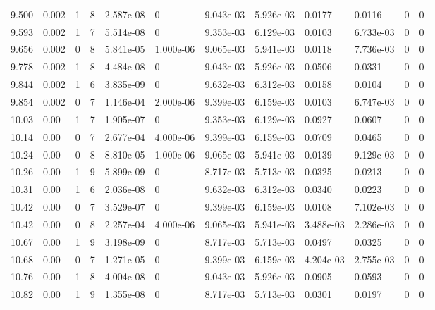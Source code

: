 \documentclass[preview]{standalone}
\begin{document}
{{{{\begin{tabular}{L{1.2cm}C{1.2cm} C{0.3cm}C{0.5cm} C{1.4cm}C{1.4cm} C{1.4cm}C{1.4cm} C{1.6cm}C{1.6cm} C{1.6cm}C{1.6cm}}
  9.500  &  0.002  & 1     &  8 &  2.587e-08  & 0  &  9.043e-03&   5.926e-03& 0.0177 & 0.0116   &  0 & 0  \\ 
  9.593  &  0.002  & 1     &  7 &  5.514e-08  & 0  &  9.353e-03&   6.129e-03& 0.0103 & 6.733e-03   &  0 & 0  \\ 
  9.656  &  0.002  & 0     &  8 &  5.841e-05  & 1.000e-06  &  9.065e-03&   5.941e-03& 0.0118 & 7.736e-03   &  0 & 0  \\ 
  9.778  &  0.002  & 1     &  8 &  4.484e-08  & 0  &  9.043e-03&   5.926e-03& 0.0506 & 0.0331   &  0 & 0  \\ 
  9.844  &  0.002  & 1     &  6 &  3.835e-09  & 0  &  9.632e-03&   6.312e-03& 0.0158 & 0.0104   &  0 & 0  \\ 
  9.854  &  0.002  & 0     &  7 &  1.146e-04  & 2.000e-06  &  9.399e-03&   6.159e-03& 0.0103 & 6.747e-03   &  0 & 0  \\ 
  10.03  &  0.00  & 1     &  7 &  1.905e-07  & 0  &  9.353e-03&   6.129e-03& 0.0927 & 0.0607   &  0 & 0  \\ 
  10.14  &  0.00  & 0     &  7 &  2.677e-04  & 4.000e-06  &  9.399e-03&   6.159e-03& 0.0709 & 0.0465   &  0 & 0  \\ 
  10.24  &  0.00  & 0     &  8 &  8.810e-05  & 1.000e-06  &  9.065e-03&   5.941e-03& 0.0139 & 9.129e-03   &  0 & 0  \\ 
  10.26  &  0.00  & 1     &  9 &  5.899e-09  & 0  &  8.717e-03&   5.713e-03& 0.0325 & 0.0213   &  0 & 0  \\ 
  10.31  &  0.00  & 1     &  6 &  2.036e-08  & 0  &  9.632e-03&   6.312e-03& 0.0340 & 0.0223   &  0 & 0  \\ 
  10.42  &  0.00  & 0     &  7 &  3.529e-07  & 0  &  9.399e-03&   6.159e-03& 0.0108 & 7.102e-03   &  0 & 0  \\ 
  10.42  &  0.00  & 0     &  8 &  2.257e-04  & 4.000e-06  &  9.065e-03&   5.941e-03& 3.488e-03 & 2.286e-03   &  0 & 0  \\ 
  10.67  &  0.00  & 1     &  9 &  3.198e-09  & 0  &  8.717e-03&   5.713e-03& 0.0497 & 0.0325   &  0 & 0  \\ 
  10.68  &  0.00  & 0     &  7 &  1.271e-05  & 0  &  9.399e-03&   6.159e-03& 4.204e-03 & 2.755e-03   &  0 & 0  \\ 
  10.76  &  0.00  & 1     &  8 &  4.004e-08  & 0  &  9.043e-03&   5.926e-03& 0.0905 & 0.0593   &  0 & 0  \\ 
  10.82  &  0.00  & 1     &  9 &  1.355e-08  & 0  &  8.717e-03&   5.713e-03& 0.0301 & 0.0197   &  0 & 0  \\ 

\end{tabular}}}}}
\end{document}
